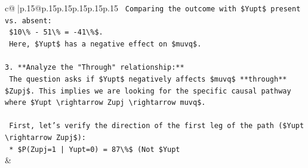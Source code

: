 \documentclass{article}
\begin{document}
{\begin{supertabular}{c@{$\;$}|p{.15\linewidth}@{}p{.15\linewidth}p{.15\linewidth}p{.15\linewidth}p{.15\linewidth}p{.15\linewidth}}
{{{\texttt{        Comparing the outcome with \$Yupt\$ present vs. absent:} \\
\texttt{        \$10\textbackslash{}\% {-} 51\textbackslash{}\% = {-}41\textbackslash{}\%\$.} \\
\texttt{        Here, \$Yupt\$ has a negative effect on \$muvq\$.} \\
\\ 
\texttt{3.  **Analyze the "Through" relationship:**} \\
\texttt{    The question asks if \$Yupt\$ negatively affects \$muvq\$ **through** \$Zupj\$. This implies we are looking for the specific causal pathway where \$Yupt \textbackslash{}rightarrow Zupj \textbackslash{}rightarrow muvq\$.} \\
\\ 
\texttt{    First, let's verify the direction of the first leg of the path (\$Yupt \textbackslash{}rightarrow Zupj\$):} \\
\texttt{    *   \$P(Zupj=1 | Yupt=0) = 87\textbackslash{}\%\$ (Not \$Yupt} \\
            }
        }
    }
    & \\ \\


\end{supertabular}}
\end{document}
